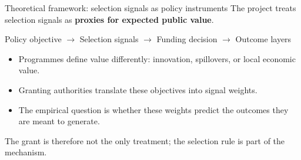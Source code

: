 \documentclass[aspectratio=169]{beamer}
\newcommand{\highlight}[1]{\textcolor{VeronaBlue}{\textbf{#1}}}
\begin{document}
\begin{frame}{Theoretical framework: selection signals as policy instruments}
  \large
  The project treats selection signals as \highlight{proxies for expected public value}.
  \vspace{0.45cm}
  \begin{center}
  \large
  Policy objective $\rightarrow$ Selection signals $\rightarrow$ Funding decision $\rightarrow$ Outcome layers
  \end{center}
  \vspace{0.45cm}
  \normalsize
  \begin{itemize}
    \item Programmes define value differently: innovation, spillovers, or local economic value.
    \item Granting authorities translate these objectives into signal weights.
    \item The empirical question is whether these weights predict the outcomes they are meant to generate.
  \end{itemize}
  \vspace{0.25cm}
  \small
  The grant is therefore not the only treatment; the selection rule is part of the mechanism.
\end{frame}
\end{document}

